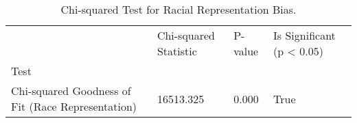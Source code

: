 \begin{table}[htbp]
\centering
\caption{Chi-squared Test for Racial Representation Bias.}
\label{tab:stat-test-representation}
\begin{tabular}{llll}
\toprule
 & Chi-squared Statistic & P-value & Is Significant (p < 0.05) \\
Test &  &  &  \\
\midrule
Chi-squared Goodness of Fit (Race Representation) & 16513.325 & 0.000 & True \\
\bottomrule
\end{tabular}

\end{table}